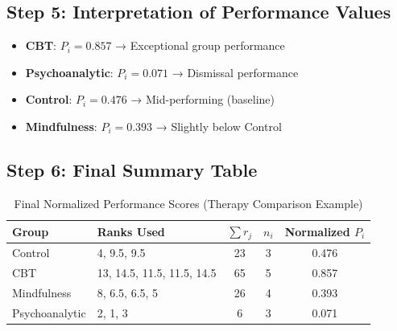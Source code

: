 \documentclass[a4paper,fleqn,review]{cas-sc}
\begin{document}
\vspace{1em}

\subsection*{Step 5: Interpretation of Performance Values}

\begin{itemize}
	\item \textbf{CBT}: $P_i = 0.857$ → Exceptional group performance
	\item \textbf{Psychoanalytic}: $P_i = 0.071$ → Dismissal performance
	\item \textbf{Control}: $P_i = 0.476$ → Mid-performing (baseline)
	\item \textbf{Mindfulness}: $P_i = 0.393$ → Slightly below Control
\end{itemize}

\vspace{1em}

\subsection*{Step 6: Final Summary Table}

\begin{table}[!hbtp]
	\centering
	\renewcommand{\arraystretch}{1.3}
	\begin{tabular}{|l|l|c|c|c|}
		\hline
		\textbf{Group} & \textbf{Ranks Used} & $\sum r_j$ & $n_i$ & \textbf{Normalized $P_i$} \\
		\hline
		Control & 4, 9.5, 9.5 & 23 & 3 & 0.476 \\
		CBT & 13, 14.5, 11.5, 11.5, 14.5 & 65 & 5 & 0.857 \\
		Mindfulness & 8, 6.5, 6.5, 5 & 26 & 4 & 0.393 \\
		Psychoanalytic & 2, 1, 3 & 6 & 3 & 0.071 \\
		\hline
	\end{tabular}
	\caption{Final Normalized Performance Scores (Therapy Comparison Example)}
\end{table}

\pagebreak


\appendix
\end{document}
